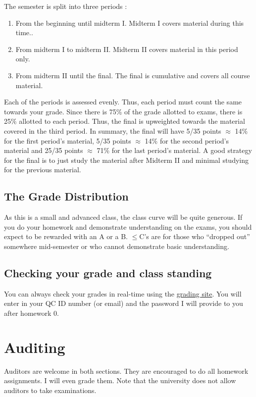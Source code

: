 \documentclass[12pt]{article}
\newcommand{\qu}[1]{``#1''}
\begin{document}
The semester is split into three periods :

\begin{enumerate}
\item From the beginning until midterm I. Midterm I covers material during this time..
\item From midterm I to midterm II. Midterm II covers material in this period only. 
\item From midterm II until the final. The final is cumulative and covers all course material.
\end{enumerate}

Each of the periods is assessed evenly. Thus, each period must count the same towards your grade. Since there is 75\% of the grade allotted to exams, there is 25\% allotted to each period. Thus, the final is upweighted towards the material covered in the third period. In summary, the final will have 5/35 points $\approx$ 14\% for the first period's material, 5/35 points $\approx$ 14\% for the second period's material and 25/35 points $\approx$ 71\% for the last period's material. A good strategy for the final is to just study the material after Midterm II and minimal studying for the previous material.

\subsection*{The Grade Distribution}

As this is a small and advanced class, the class curve will be quite generous. If you do your homework and demonstrate understanding on the exams, you should expect to be rewarded with an A or a B. $\leq$C's are for those who \qu{dropped out} somewhere mid-semester or who cannot demonstrate basic understanding.

\subsection*{Checking your grade and class standing}

You can always check your grades in real-time using the \href{http://gradesly.com}{grading site}. You will enter in your QC ID number (or email) and the password I will provide to you after homework 0.



\section*{Auditing}

Auditors are welcome in both sections. They are encouraged to do all homework assignments. I will even grade them. Note that the university does not allow auditors to take examinations.
\end{document}
